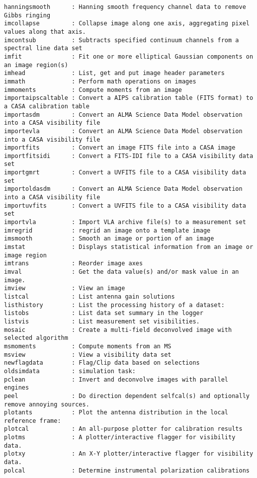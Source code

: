 \begin{verbatim}
hanningsmooth      : Hanning smooth frequency channel data to remove Gibbs ringing
imcollapse         : Collapse image along one axis, aggregating pixel values along that axis.
imcontsub          : Subtracts specified continuum channels from a spectral line data set
imfit              : Fit one or more elliptical Gaussian components on an image region(s)
imhead             : List, get and put image header parameters
immath             : Perform math operations on images
immoments          : Compute moments from an image
importaipscaltable : Convert a AIPS calibration table (FITS format) to a CASA calibration table
importasdm         : Convert an ALMA Science Data Model observation into a CASA visibility file
importevla         : Convert an ALMA Science Data Model observation into a CASA visibility file
importfits         : Convert an image FITS file into a CASA image
importfitsidi      : Convert a FITS-IDI file to a CASA visibility data set
importgmrt         : Convert a UVFITS file to a CASA visibility data set
importoldasdm      : Convert an ALMA Science Data Model observation into a CASA visibility file
importuvfits       : Convert a UVFITS file to a CASA visibility data set
importvla          : Import VLA archive file(s) to a measurement set
imregrid           : regrid an image onto a template image
imsmooth           : Smooth an image or portion of an image
imstat             : Displays statistical information from an image or image region
imtrans            : Reorder image axes
imval              : Get the data value(s) and/or mask value in an image.
imview             : View an image
listcal            : List antenna gain solutions
listhistory        : List the processing history of a dataset:
listobs            : List data set summary in the logger
listvis            : List measurement set visibilities.
mosaic             : Create a multi-field deconvolved image with selected algorithm
msmoments          : Compute moments from an MS
msview             : View a visibility data set
newflagdata        : Flag/Clip data based on selections
oldsimdata         : simulation task:
pclean             : Invert and deconvolve images with parallel engines
peel               : Do direction dependent selfcal(s) and optionally remove annoying sources.
plotants           : Plot the antenna distribution in the local reference frame:
plotcal            : An all-purpose plotter for calibration results 
plotms             : A plotter/interactive flagger for visibility data.
plotxy             : An X-Y plotter/interactive flagger for visibility data.
polcal             : Determine instrumental polarization calibrations

\end{verbatim}
